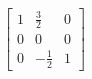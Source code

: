 \[
  \left[
  \begin{array}{ccc}
	  1 & \frac{3}{2} & 0 \\
	  0 & 0 & 0 \\
	  0 & -\frac{1}{2} & 1
  \end{array}
  \right]
  \]